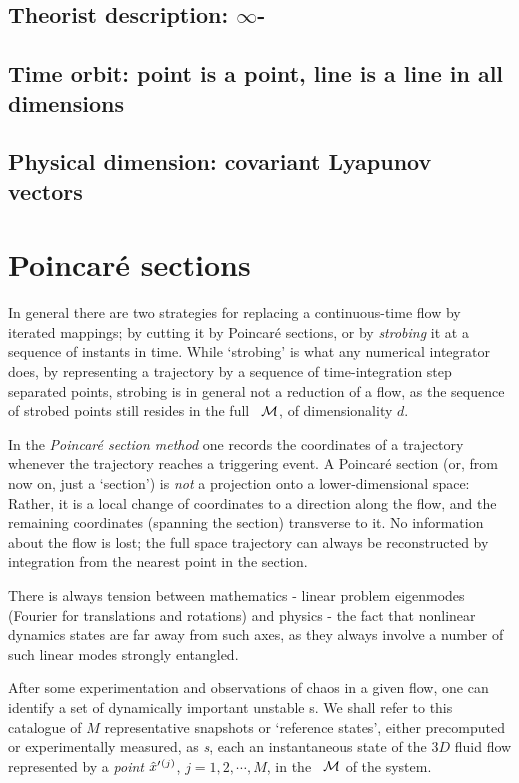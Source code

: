 \subsection{Theorist description: $\infty$-\dmn\ \statesp}
\subsection{Time orbit: point is a point, line is a line in all dimensions}
\label{sect:TimeOrb}

\subsection{Physical dimension: covariant Lyapunov vectors}

\section{Poincar\'e sections}
\label{s:cut}

In general there are two strategies for replacing a continuous-time flow
by iterated mappings; by cutting it by Poincar\'e sections, or by
\emph{strobing} it at a sequence of instants in time. While
`strobing' is what any numerical integrator does, by representing a
trajectory by a sequence of time-integration step separated points,
strobing is in general not a reduction of a flow, as the sequence of
strobed points still resides in the full \statesp\ ${\cal M}$, of
dimensionality $d$.

In the {\em Poincar\'e section method} one records the coordinates of a
trajectory whenever the trajectory reaches a
triggering event. A Poincar\'e section (or, from now on,
just a `section') is {\em not} a projection onto a lower-dimensional space:
Rather, it is a local change of coordinates to a direction along the
flow, and the remaining coordinates (spanning the section) transverse to
it. No information about the flow is lost; the full
space trajectory can always be reconstructed by integration from the
nearest point in the section.

    \ifdraft\color{blue}
        There is always tension between mathematics - linear problem eigenmodes
        (Fourier for translations and rotations) and physics - the fact that
        nonlinear dynamics states are far away from such axes, as they
        always involve a number of such linear modes strongly entangled.
    \color{black}\fi


After some experimentation and observations of chaos in a given
flow, one can identify a set of dynamically important unstable
{\recurrStr s}.
We shall refer to this catalogue of $M$ representative snapshots or
`reference states', either precomputed or experimentally measured, as
\emph{\template s}, each an
instantaneous state of the $3D$ fluid flow represented by a \emph{point}
${\hat{x}'}{}^{(j)}$, $j=1,2,\cdots,M$, in the \statesp\ ${\cal M}$ of the
system.



